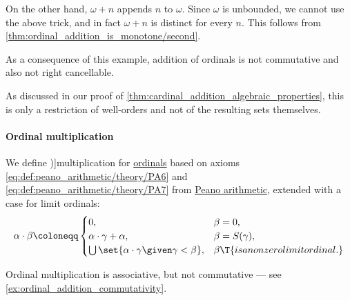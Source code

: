 \begin{example}
  On the other hand, \( \omega + n \) appends \( n \) to \( \omega \). Since \( \omega \) is unbounded, we cannot use the above trick, and in fact \( \omega + n \) is distinct for every \( n \). This follows from \cref{thm:ordinal_addition_is_monotone/second}.

  As a consequence of this example, addition of ordinals is not commutative and also not right cancellable.

  As discussed in our proof of \cref{thm:cardinal_addition_algebraic_properties}, this is only a restriction of well-orders and not of the resulting sets themselves.
\end{example}

\paragraph{Ordinal multiplication}

\begin{definition}\label{def:ordinal_multiplication}
  We define \term[en=multiplication (\cite[def. 2.19]{Jech2006SetTheory})]{multiplication} for \hyperref[def:ordinal]{ordinals} based on axioms \eqref{eq:def:peano_arithmetic/theory/PA6} and \eqref{eq:def:peano_arithmetic/theory/PA7} from \hyperref[def:peano_arithmetic]{Peano arithmetic}, extended with a case for limit ordinals:
  \begin{equation*}
    \alpha \cdot \beta \coloneqq \begin{cases}
      0,                                                        &\beta = 0, \\
      \alpha \cdot \gamma + \alpha,                             &\beta = S(\gamma), \\
      \bigcup\set{ \alpha \cdot \gamma \given \gamma < \beta }, &\beta \T{is a nonzero limit ordinal.}
    \end{cases}
  \end{equation*}
\end{definition}
\begin{comments}
  \item Ordinal multiplication is associative, but not commutative --- see \cref{ex:ordinal_addition_commutativity}.
\end{comments}

